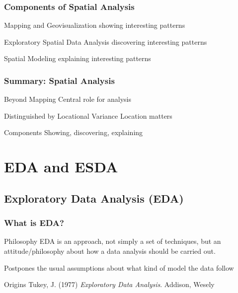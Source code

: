 \documentclass[nototal,handout]{beamer}
\begin{document}
\begin{frame}
	\frametitle{Components of Spatial Analysis}
 
\begin{block}{Mapping and Geovisualization}
  \alert{showing} interesting patterns
 \end{block} 
\begin{block}{Exploratory Spatial Data Analysis}
  \alert{discovering} interesting patterns
 \end{block} 
\begin{block}{Spatial Modeling}
  \alert{explaining} interesting patterns
 \end{block} \end{frame} 

\begin{frame}
	\frametitle{Summary: Spatial Analysis}
 
\begin{block}{Beyond Mapping}
  Central role for \alert{analysis}
 \end{block} 
\begin{block}{Distinguished by Locational Variance}
  \alert{Location} matters
 \end{block} 
\begin{block}{Components}
  Showing, discovering, explaining
 \end{block} \end{frame} 


\section{EDA and ESDA} 

\subsection{Exploratory Data Analysis (EDA)} 

\begin{frame}
	\frametitle{What is EDA?}
 
\begin{block}{Philosophy}
  EDA is an approach, not simply a set of techniques, but an
  attitude/philosophy about how a data analysis should be carried
  out.
 
 Postpones the usual assumptions about what kind of model the data follow
 \end{block} 
\begin{block}{Origins}
  Tukey, J. (1977) \emph{Exploratory Data Analysis}. Addison,
  Wesely
 \end{block} \end{frame} 
\end{document}
